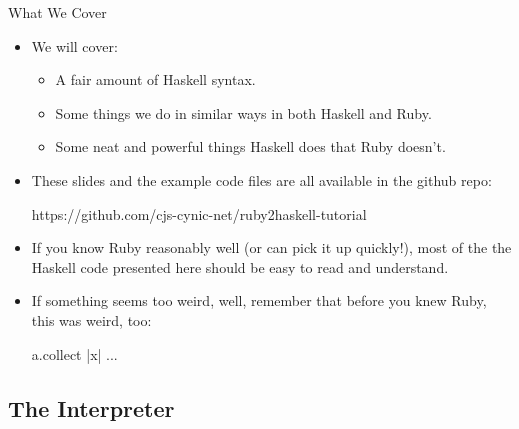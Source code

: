 \documentclass[xcolor=dvipsnames]{beamer}          %
\begin{document}
\begin{frame}[fragile]{What We Cover}
\begin{itemize}
    \item We will cover:
    \begin{itemize}
        \item A fair amount of Haskell syntax.
        \item Some things we do in similar ways in both Haskell and Ruby.
        \item Some neat and powerful things Haskell does that Ruby doesn't.
    \end{itemize}
    \item These slides and the example code files are all available in
        the github repo:
        \begin{olisting}
            https://github.com/cjs-cynic-net/ruby2haskell-tutorial
        \end{olisting}
    \item If you know Ruby reasonably well (or can pick it up quickly!),
        most of the the Haskell code presented here should be easy to
        read and understand.
    \item If something seems too weird, well, remember that before you
        knew Ruby, this was weird, too:
        \begin{rlisting}
            a.collect { |x| ... }
        \end{rlisting}
\end{itemize}
\end{frame}


\subsection{The Interpreter}
\end{document}
